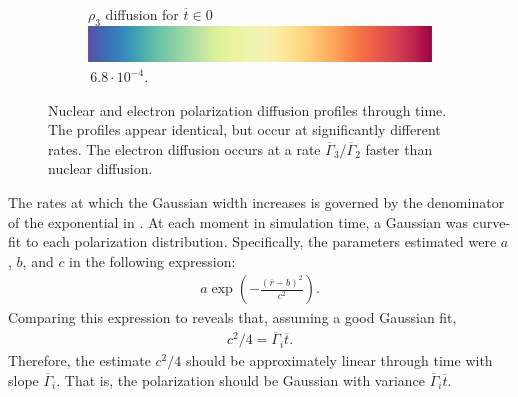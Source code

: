 \documentclass[onecolumn]{amsart}
\begin{document}
\begin{figure}
\begin{subfigure}[b]{.5\linewidth}
\caption{\small $\rho_3$ diffusion for $\overline{t} \in 0$ \,\includegraphics[height=1.5ex,width=.5in]{figures/colorbar.pdf}\,$6.8\cdot 10^{-4}$.}\label{fig:1b}
\end{subfigure}
\caption{Nuclear and electron polarization diffusion profiles through time. The profiles appear identical, but occur at significantly different rates. The electron diffusion occurs at a rate $\overline{\Gamma}_3/\overline{\Gamma}_2$ faster than nuclear diffusion.}\label{fig:1}
\end{figure}

The rates at which the Gaussian width increases is governed by the denominator of the exponential in .
At each moment in simulation time, a Gaussian was curve-fit to each polarization distribution.
Specifically, the parameters estimated were \(a\), \(b\), and \(c\) in the following expression:
\begin{align}
a \exp\!\left(
-\frac{(\overline{r}-b)^2}{c^2}
\right).
\end{align}
Comparing this expression to  reveals that, assuming a good Gaussian fit,
\begin{align}
c^2/4 = \overline{\Gamma}_i \overline{t}.
\end{align}
Therefore, the estimate \(c^2/4\) should be approximately linear through time with slope \(\overline{\Gamma}_i\).
That is, the polarization should be Gaussian with variance \(\overline{\Gamma}_i \overline{t}\).
\end{document}

